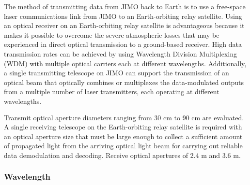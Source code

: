 The method of transmitting data from JIMO back to Earth is to use a free-space laser communications link from JIMO to an Earth-orbiting relay satellite. Using an optical receiver on an Earth-orbiting relay satellite is advantageous because it makes it possible to overcome the severe  atmospheric losses that may be experienced in direct optical transmission to a ground-based receiver. High data transmission rates can be achieved by using Wavelength Division Multiplexing (WDM) with multiple optical carriers each at different wavelengths. Additionally, a single transmitting telescope on JIMO can support the transmission of an optical beam that optically combines or multiplexes the data-modulated outputs from a multiple number of laser transmitters, each operating at different wavelengths.

Transmit optical aperture diameters ranging from 30 cm to 90 cm are evaluated. A single receiving telescope on the Earth-orbiting relay satellite is required with an optical aperture size that must be large enough to collect a sufficient amount of propagated light from the arriving optical light beam for carrying out reliable data demodulation and decoding. Receive optical apertures of 2.4 m and 3.6 m.

\subsubsection{Wavelength}

